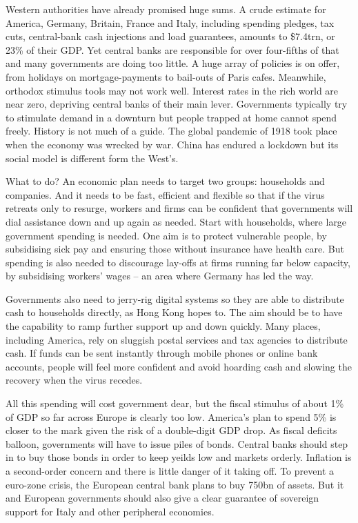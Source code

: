 \documentclass[a4paper,10pt]{article}
\begin{document}
{{{{{{{Western authorities have already promised huge sums.
A crude estimate for America, Germany, Britain, France and Italy, including spending pledges, tax cuts, central-bank cash injections and load guarantees, amounts to \$7.4trn, or 23\% of their GDP.
Yet central banks are responsible for over four-fifths of that and many governments are doing too little.
A huge array of policies is on offer, from holidays on mortgage-payments to bail-outs of Paris cafes.
Meanwhile, orthodox stimulus tools may not work well.
Interest rates in the rich world are near zero, depriving central banks of their main lever.
Governments typically try to stimulate demand in a downturn but people trapped at home cannot spend freely.
History is not much of a guide.
The global pandemic of 1918 took place when the economy was wrecked by war.
China has endured a lockdown but its social model is different form the West's.

What to do? An economic plan needs to target two groups: households and companies.
And it needs to be fast, efficient and flexible so that if the virus retreats only to resurge, workers and firms can be confident that governments will dial assistance down and up again as needed.
Start with households, where large government spending is needed.
One aim is to protect vulnerable people, by subsidising sick pay and ensuring those without insurance have health care.
But spending is also needed to discourage lay-offs at firms running far below capacity, by subsidising workers' wages -- an area where Germany has led the way.

Governments also need to jerry-rig digital systems so they are able to distribute cash to households directly, as Hong Kong hopes to.
The aim should be to have the capability to ramp further support up and down quickly.
Many places, including America, rely on sluggish postal services and tax agencies to distribute cash.
If funds can be sent instantly through mobile phones or online bank accounts, people will feel more confident and avoid hoarding cash and slowing the recovery when the virus recedes.

All this spending will cost government dear, but the fiscal stimulus of about 1\% of GDP so far across Europe is clearly too low.
America's plan to spend 5\% is closer to the mark given the risk of a double-digit GDP drop.
As fiscal deficits balloon, governments will have to issue piles of bonds.
Central banks should step in to buy those bonds in order to keep yeilds low and markets orderly.
Inflation is a second-order concern and there is little danger of it taking off.
To prevent a euro-zone crisis, the European central bank plans to buy 750bn of assets.
But it and European governments should also give a clear guarantee of sovereign support for Italy and other peripheral economies.

}}}}}}}
\end{document}
